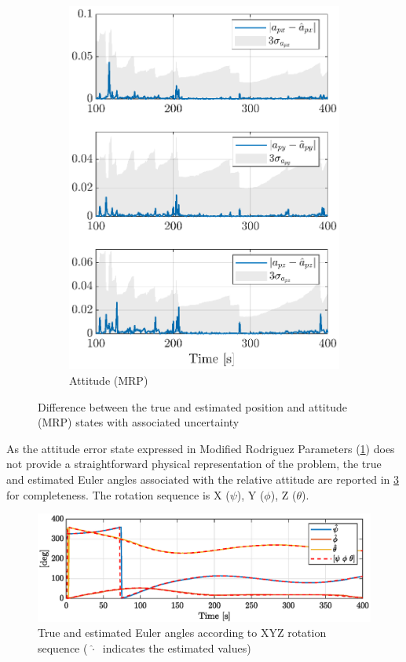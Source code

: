 \begin{figure}[!h]
\begin{subfigure}[b]{0.48\textwidth}
    \includegraphics[width=\linewidth]{Images/sigmaatt.eps}
    \caption{Attitude (MRP)}
    \label{fig:sigma_att}
    \end{subfigure}
    \caption{Difference between the true and estimated position and attitude (MRP) states with associated uncertainty}
    \label{fig:sigma_posatt}
\end{figure}
As the attitude error state expressed in Modified Rodriguez Parameters (\cref{fig:sigma_att}) does not provide a straightforward physical representation of the problem, the true and estimated Euler angles associated with the relative attitude are reported in \cref{fig:eulerangles} for completeness. The rotation sequence is X ($\psi$), Y ($\phi$), Z ($\theta$).\newline
\begin{figure}[!h]
    \centering
    \includegraphics[width = \linewidth]{Images/eulerangles.eps}
    \caption[True and estimated Euler angles]{True and estimated Euler angles according to XYZ rotation sequence ($\ \hat{\cdot} \ $ indicates the estimated values)}
    \label{fig:eulerangles}
\end{figure}

